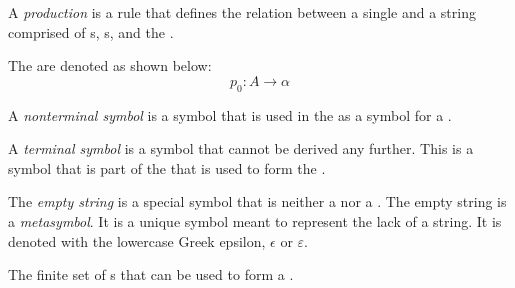 \begin{definition}[Production]\label{def:Production}
  A \emph{production} is a rule that defines the relation between a single  and a string comprised of s, s, and the .

  The are denoted as shown below:
  \begin{equation}\label{eq:Production}
    p_{0}: A \rightarrow \alpha
  \end{equation}
\end{definition}

\begin{definition}\label{def:Nonterminal_Symbol}
  A \emph{nonterminal symbol} is a symbol that is used in the  as a symbol for a .
\end{definition}

\begin{definition}\label{def:Terminal_Symbol}
  A \emph{terminal symbol} is a symbol that cannot be derived any further.
  This is a symbol that is part of the  that is used to form the .
\end{definition}

\begin{definition}\label{def:Empty_String}
  The \emph{empty string} is a special symbol that is neither a  nor a .
  The empty string is a \emph{metasymbol}.
  It is a unique symbol meant to represent the lack of a string.
  It is denoted with the lowercase Greek epsilon, $\epsilon$ or $\varepsilon$.
\end{definition}

\begin{definition}[Alphabet]\label{def:Alphabet}
  The finite set of s that can be used to form a .
\end{definition}

